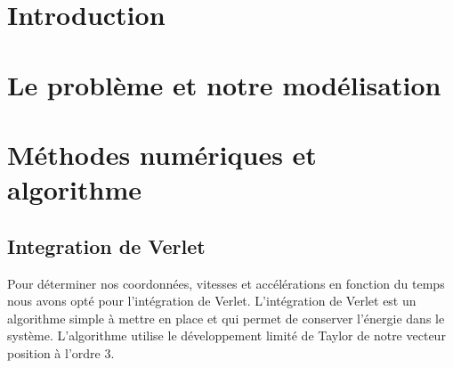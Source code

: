 \documentclass[a4paper, 11pt, oneside]{article} %
\begin{document}
 
\usetikzlibrary{patterns,patterns.meta}
\tableofcontents
\listoffigures
\listoftables

\newpage
\section*{Introduction}
    

\section{Le problème et notre modélisation}
    

\section{Méthodes numériques et algorithme}
    \subsection{Integration de Verlet}
        Pour déterminer nos coordonnées, vitesses et accélérations en fonction du temps nous avons opté pour l'intégration de Verlet. L'intégration de Verlet est un algorithme simple à mettre en place et qui permet de conserver l'énergie dans le système. L'algorithme utilise le développement limité de Taylor de notre vecteur position à l'ordre 3.
\end{document}
